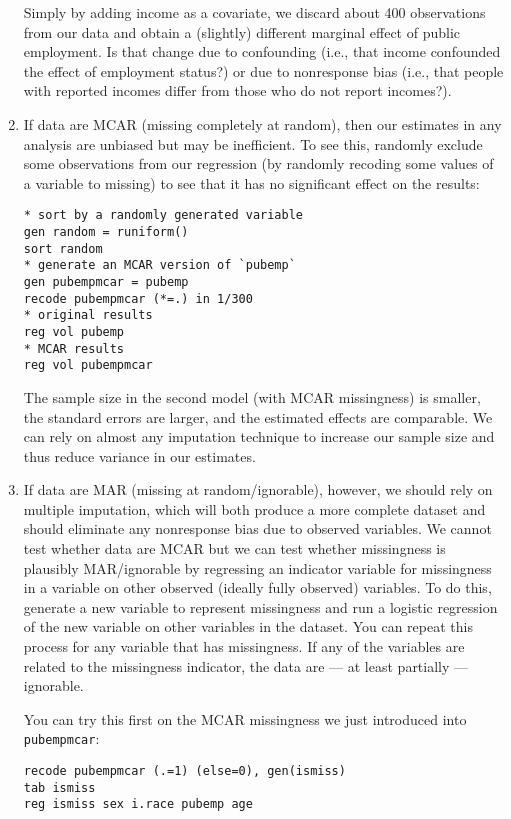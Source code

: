 \documentclass[a4paper,12pt]{article}
\begin{document}
\begin{enumerate}
Simply by adding income as a covariate, we discard about 400 observations from our data and obtain a (slightly) different marginal effect of public employment. Is that change due to confounding (i.e., that income confounded the effect of employment status?) or due to nonresponse bias (i.e., that people with reported incomes differ from those who do not report incomes?).

\item If data are MCAR (missing completely at random), then our estimates in any analysis are unbiased but may be inefficient. To see this, randomly exclude some observations from our regression (by randomly recoding some values of a variable to missing) to see that it has no significant effect on the results:

\begin{verbatim}
* sort by a randomly generated variable
gen random = runiform()
sort random
* generate an MCAR version of `pubemp`
gen pubempmcar = pubemp
recode pubempmcar (*=.) in 1/300
* original results
reg vol pubemp
* MCAR results
reg vol pubempmcar
\end{verbatim}

The sample size in the second model (with MCAR missingness) is smaller, the standard errors are larger, and the estimated effects are comparable. We can rely on almost any imputation technique to increase our sample size and thus reduce variance in our estimates.

\item If data are MAR (missing at random/ignorable), however, we should rely on multiple imputation, which will both produce a more complete dataset and should eliminate any nonresponse bias due to observed variables. We cannot test whether data are MCAR but we can test whether missingness is plausibly MAR/ignorable by regressing an indicator variable for missingness in a variable on other observed (ideally fully observed) variables. To do this, generate a new variable to represent missingness and run a logistic regression of the new variable on other variables in the dataset. You can repeat this process for any variable that has missingness. If any of the variables are related to the missingness indicator, the data are --- at least partially --- ignorable.

You can try this first on the MCAR missingness we just introduced into \texttt{pubempmcar}:

\begin{verbatim}
recode pubempmcar (.=1) (else=0), gen(ismiss)
tab ismiss
reg ismiss sex i.race pubemp age
\end{verbatim}


\end{enumerate}
\end{document}
